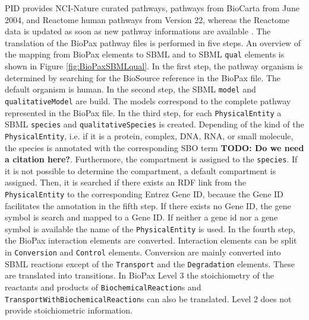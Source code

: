 \documentclass{bioinfo}
\newcommand{\qual}{\texttt{qual}}
\begin{document}
\begin{methods}
PID provides NCI-Nature curated pathways, pathways from BioCarta from June
2004, and Reactome human pathways from Version 22, whereas the Reactome data is updated as soon as new pathway informations are available \citep{Schaefer2009}.
The translation of the BioPax pathway files is performed in five steps.
An overview of the mapping from BioPax elements to SBML and to SBML \qual{} elements is shown in Figure \ref{fig:BioPaxSBMLqual}.
In the first step, the pathway organism is determined by searching for the BioSource reference in the BioPax file.
The default organism is human.
In the second step, the SBML \texttt{model} and \texttt{qualitativeModel} are build.
The models correspond to the complete pathway represented in the BioPax file.
In the third step, for each \texttt{PhysicalEntity} a SBML \texttt{species} and \texttt{qualitativeSpecies} is created.
Depending of the kind of the \texttt{PhysicalEntity}, i.e. if it is a protein, complex, DNA, RNA, or small molecule, the species is annotated with the corresponding SBO term \textbf{TODO: Do we need a citation here?}.
Furthermore, the compartment is assigned to the \texttt{species}. If it is not possible to determine the compartment, a default compartment is assigned.
Then, it is searched if there exists an RDF link from the \texttt{PhysicalEntity} to the corresponding Entrez Gene ID, because the Gene ID facilitates the annotation in the fifth step.
If there exists no Gene ID, the gene symbol is search and mapped to a Gene ID.
If neither a gene id nor a gene symbol is available the name of the \texttt{PhysicalEntity} is used.
In the fourth step, the BioPax interaction elements are converted. 
Interaction elements can be split in \texttt{Conversion} and \texttt{Control} elements.
Conversion are mainly converted into SBML reactions except of the \texttt{Transport} and the \texttt{Degradation} elements.
These are translated into transitions. 
In BioPax Level 3 the stoichiometry of the reactants and products of \texttt{BiochemicalReaction}s and \texttt{TransportWithBiochemicalReaction}s can also be translated. 
Level 2 does not provide stoichiometric information.


\end{methods}
\end{document}
